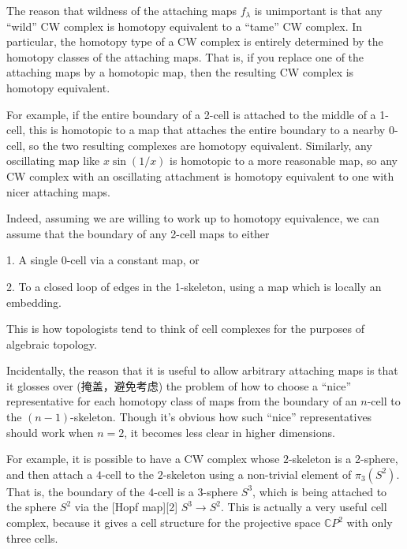 The reason that wildness of the attaching maps $f_\lambda$ is unimportant is that any ``wild'' CW complex is homotopy equivalent to a ``tame'' CW complex.  In particular, the homotopy type of a CW complex is entirely determined by the homotopy classes of the attaching maps. That is, if you replace one of the attaching maps by a homotopic map, then the resulting CW complex is homotopy equivalent.\par

For example, if the entire boundary of a 2-cell is attached to the middle of a 1-cell, this is homotopic to a map that attaches the entire boundary to a nearby 0-cell, so the two resulting complexes are homotopy equivalent.  Similarly, any oscillating map like $x\sin(1/x)$ is homotopic to a more reasonable map, so any CW complex with an oscillating attachment is homotopy equivalent to one with nicer attaching maps.\par

Indeed, assuming we are willing to work up to homotopy equivalence, we can assume that the boundary of any 2-cell maps to either

1. A single 0-cell via a constant map, or

2. To a closed loop of edges in the 1-skeleton, using a map which is locally an embedding.\par

This is how topologists tend to think of cell complexes for the purposes of algebraic topology.\par

Incidentally, the reason that it is useful to allow arbitrary attaching maps is that it glosses over (掩盖，避免考虑) the problem of how to choose a ``nice'' representative for each homotopy class of maps from the boundary of an $n$-cell to the $(n-1)$-skeleton.  Though it's obvious how such ``nice'' representatives should work when $n=2$, it becomes less clear in higher dimensions.\par

For example, it is possible to have a CW complex whose $2$-skeleton is a 2-sphere, and then attach a $4$-cell to the $2$-skeleton using a non-trivial element of $\pi_3(S^2)$.  That is, the boundary of the $4$-cell is a $3$-sphere $S^3$, which is being attached to the sphere $S^2$ via the [Hopf map][2] $S^3 \to S^2$.  This is actually a very useful cell complex, because it gives a cell structure for the projective space $\mathbb{C}P^2$ with only three cells.\par

